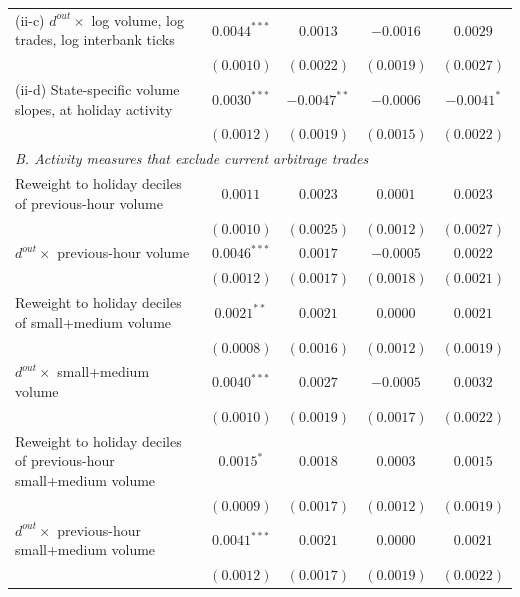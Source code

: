 \begin{tabular}{lcccc}
(ii-c) $d^{out}\times$ log volume, log trades, log interbank ticks & $0.0044^{***}$ & $0.0013$ & $-0.0016$ & $0.0029$ \\
 & $(0.0010)$ & $(0.0022)$ & $(0.0019)$ & $(0.0027)$ \\
(ii-d) State-specific volume slopes, at holiday activity & $0.0030^{***}$ & $-0.0047^{**}$ & $-0.0006$ & $-0.0041^{*}$ \\
 & $(0.0012)$ & $(0.0019)$ & $(0.0015)$ & $(0.0022)$ \\
\midrule
\multicolumn{5}{l}{\emph{B. Activity measures that exclude current arbitrage trades}} \\
Reweight to holiday deciles of previous-hour volume & $0.0011$ & $0.0023$ & $0.0001$ & $0.0023$ \\
 & $(0.0010)$ & $(0.0025)$ & $(0.0012)$ & $(0.0027)$ \\
$d^{out}\times$ previous-hour volume & $0.0046^{***}$ & $0.0017$ & $-0.0005$ & $0.0022$ \\
 & $(0.0012)$ & $(0.0017)$ & $(0.0018)$ & $(0.0021)$ \\
Reweight to holiday deciles of small+medium volume & $0.0021^{**}$ & $0.0021$ & $0.0000$ & $0.0021$ \\
 & $(0.0008)$ & $(0.0016)$ & $(0.0012)$ & $(0.0019)$ \\
$d^{out}\times$ small+medium volume & $0.0040^{***}$ & $0.0027$ & $-0.0005$ & $0.0032$ \\
 & $(0.0010)$ & $(0.0019)$ & $(0.0017)$ & $(0.0022)$ \\
Reweight to holiday deciles of previous-hour small+medium volume & $0.0015^{*}$ & $0.0018$ & $0.0003$ & $0.0015$ \\
 & $(0.0009)$ & $(0.0017)$ & $(0.0012)$ & $(0.0019)$ \\
$d^{out}\times$ previous-hour small+medium volume & $0.0041^{***}$ & $0.0021$ & $0.0000$ & $0.0021$ \\
 & $(0.0012)$ & $(0.0017)$ & $(0.0019)$ & $(0.0022)$ \\
\bottomrule
\end{tabular}
